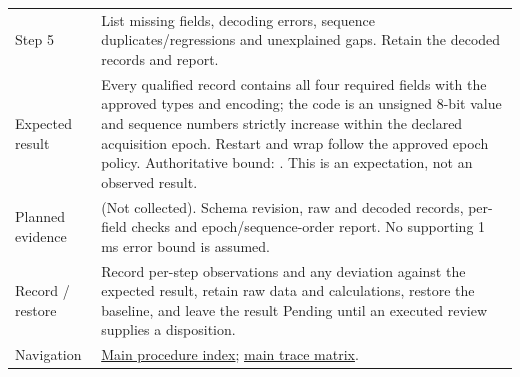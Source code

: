 \begin{tabularx}{\linewidth}{L{3.2cm}Y}
Step 5 & List missing fields, decoding errors, sequence duplicates/regressions and unexplained gaps. Retain the decoded records and report.\\
Expected result & Every qualified record contains all four required fields with the approved types and encoding; the code is an unsigned 8-bit value and sequence numbers strictly increase within the declared acquisition epoch. Restart and wrap follow the approved epoch policy. Authoritative bound: . This is an expectation, not an observed result.\\
Planned evidence &  (Not collected). Schema revision, raw and decoded records, per-field checks and epoch/sequence-order report. No supporting 1 ms error bound is assumed.\\
Record / restore & Record per-step observations and any deviation against the expected result, retain raw data and calculations, restore the baseline, and leave the result Pending until an executed review supplies a disposition.\\
Navigation & \hyperref[Table:WeekTwoTests]{Main procedure index}; \hyperref[Table:TraceabilityMatrix]{main trace matrix}.\\
\end{tabularx}
\normalsize
